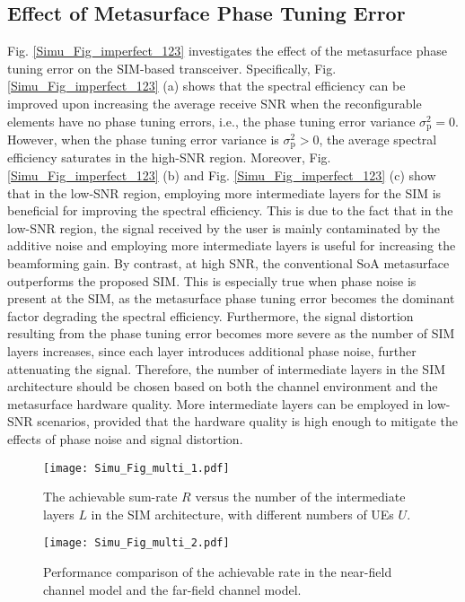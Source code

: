 \documentclass[lettersize,journal]{IEEEtran}
\theoremstyle{remark}
\begin{document}
\subsection{Effect of Metasurface Phase Tuning Error}
Fig. \ref{Simu_Fig_imperfect_123} investigates the effect of the metasurface phase tuning error on the SIM-based transceiver. Specifically, Fig. \ref{Simu_Fig_imperfect_123} (a) shows that the spectral efficiency can be improved upon increasing the average receive SNR when the reconfigurable elements have no phase tuning errors, i.e., the phase tuning error variance $\sigma_\mathrm{p}^2=0$. However, when the phase tuning error variance is $\sigma_\mathrm{p}^2>0$, the average spectral efficiency saturates in the high-SNR region. Moreover, Fig. \ref{Simu_Fig_imperfect_123} (b) and Fig. \ref{Simu_Fig_imperfect_123} (c) show that in the low-SNR region, employing more intermediate layers for the SIM is beneficial for improving the spectral efficiency. This is due to the fact that in the low-SNR region, the signal received by the user is mainly contaminated by the additive noise and employing more intermediate layers is useful for increasing the beamforming gain. By contrast, at high SNR, the conventional SoA metasurface outperforms the proposed SIM. This is especially true when phase noise is present at the SIM, as the metasurface phase tuning error becomes the dominant factor degrading the spectral efficiency. Furthermore, the signal distortion resulting from the phase tuning error becomes more severe as the number of SIM layers increases, since each layer introduces additional phase noise, further attenuating the signal. Therefore, the number of intermediate layers in the SIM architecture should be chosen based on both the channel environment and the metasurface hardware quality. More intermediate layers can be employed in low-SNR scenarios, provided that the hardware quality is high enough to mitigate the effects of phase noise and signal distortion.

\begin{figure}[!t]
    \centering
    \texttt{[image: Simu\_Fig\_multi\_1.pdf]}
    \caption{The achievable sum-rate $R$ versus the number of the intermediate layers $L$ in the SIM architecture, with different numbers of UEs $U$.}\label{Simu_Fig_multi_1}
\end{figure}

\begin{figure}[!t]
    \centering
    \texttt{[image: Simu\_Fig\_multi\_2.pdf]}
    \caption{Performance comparison of the achievable rate in the near-field channel model and the far-field channel model.}\label{Simu_Fig_multi_2}
\end{figure}
\end{document}
